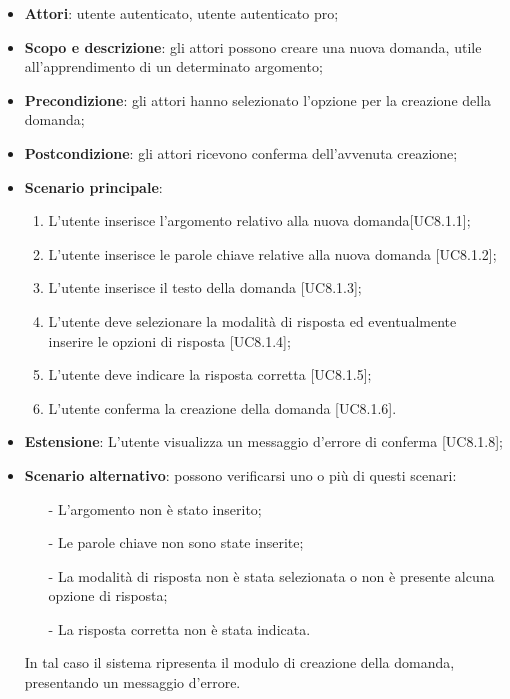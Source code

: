 	\begin{itemize}
		\item
			\textbf{Attori}: utente autenticato, utente autenticato pro;
		\item		
			\textbf{Scopo e descrizione}: gli attori possono creare una nuova domanda, utile all'apprendimento di un determinato argomento;
		\item
			\textbf{Precondizione}: gli attori hanno selezionato l'opzione per la creazione della domanda;
		\item
			\textbf{	Postcondizione}: gli attori ricevono conferma dell'avvenuta creazione;		
		\item
			\textbf{Scenario principale}:
	       		\begin{enumerate}
					\item
					L'utente inserisce l'argomento relativo alla nuova domanda[UC8.1.1];
					\item
					L'utente inserisce le parole chiave relative alla nuova domanda [UC8.1.2];
					\item
					L'utente inserisce il testo della domanda [UC8.1.3];
					\item
					L'utente deve selezionare la modalità di risposta ed eventualmente inserire le opzioni di risposta [UC8.1.4];
					\item
					L'utente deve indicare la risposta corretta [UC8.1.5];
					\item
					L'utente conferma la creazione della domanda [UC8.1.6].
	 			\end{enumerate}
	 	\item
			\textbf{Estensione}: L'utente visualizza un messaggio d'errore di conferma [UC8.1.8];
	 	\item
	 		\textbf{Scenario alternativo}: possono verificarsi uno o più di questi scenari:
				\begin{itemize}
					\item[-] 	
						L'argomento non è stato inserito;
					\item[-] 
						Le parole chiave non sono state inserite;
					\item[-] 
						La modalità di risposta non è stata selezionata o non è presente alcuna opzione di risposta; 
					\item[-]
						La risposta corretta non è stata indicata.	
				\end{itemize}
			In tal caso il sistema ripresenta il modulo di creazione della domanda, presentando un messaggio d'errore.
	\end{itemize}
